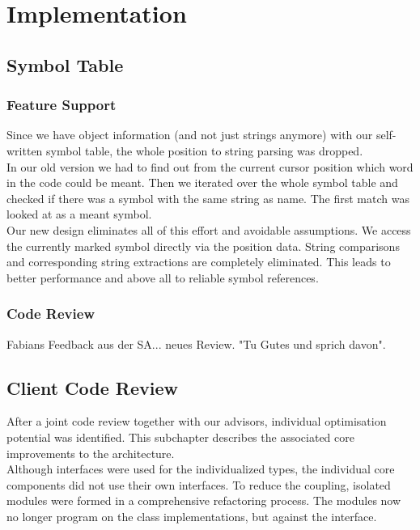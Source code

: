 \section{Implementation}

\subsection{Symbol Table}

\subsubsection{Feature Support}
Since we have object information (and not just strings anymore) with our self-written symbol table,
the whole position to string parsing was dropped. \\

In our old version we had to find out from the current cursor position which word in the code could be meant.
Then we iterated over the whole symbol table and checked if there was a symbol with the same string as name.
The first match was looked at as a meant symbol. \\

Our new design eliminates all of this effort and avoidable assumptions.
We access the currently marked symbol directly via the position data.
String comparisons and corresponding string extractions are completely eliminated.
This leads to better performance and above all to reliable symbol references.

\subsubsection{Code Review}
Fabians Feedback aus der SA... neues Review. "Tu Gutes und sprich davon".

\subsection{Client Code Review}
After a joint code review together with our advisors, individual optimisation potential was identified.
This subchapter describes the associated core improvements to the architecture. \\

Although interfaces were used for the individualized types,
the individual core components did not use their own interfaces.
To reduce the coupling, isolated modules were formed in a comprehensive refactoring process.
The modules now no longer program on the class implementations, but against the interface. \\

